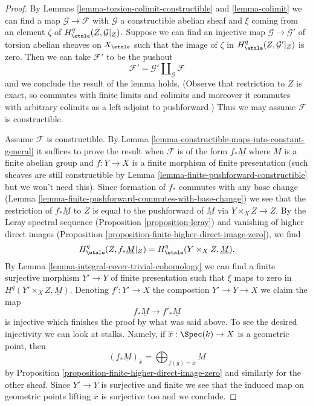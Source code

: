 \begin{proof}
By Lemmas \ref{lemma-torsion-colimit-constructible} and \ref{lemma-colimit}
we can find a map $\mathcal{G} \to \mathcal{F}$ with $\mathcal{G}$
a constructible abelian sheaf and $\xi$ coming from an element $\zeta$ of
$H^q_\etale(Z, \mathcal{G}|_Z)$. Suppose we can find an injective map
$\mathcal{G} \to \mathcal{G}'$ of torsion abelian sheaves on $X_\etale$
such that the image of $\zeta$ in $H^q_\etale(Z, \mathcal{G}'|_Z)$ is zero.
Then we can take $\mathcal{F}'$ to be the pushout
$$
\mathcal{F}' = \mathcal{G}' \amalg_{\mathcal{G}} \mathcal{F}
$$
and we conclude the result of the lemma holds. (Observe that restriction
to $Z$ is exact, so commutes with finite limits and colimits and moreover
it commutes with arbitrary colimits as a left adjoint to pushforward.)
Thus we may assume $\mathcal{F}$ is constructible.

\medskip\noindent
Assume $\mathcal{F}$ is constructible. By
Lemma \ref{lemma-constructible-maps-into-constant-general}
it suffices to prove the result when $\mathcal{F}$
is of the form $f_*\underline{M}$ where $M$ is a finite abelian group
and $f : Y \to X$ is a finite morphism of finite presentation
(such sheaves are still constructible by
Lemma \ref{lemma-finite-pushforward-constructible}
but we won't need this).
Since formation of $f_*$ commutes with any base change
(Lemma \ref{lemma-finite-pushforward-commutes-with-base-change})
we see that the restriction of $f_*\underline{M}$ to $Z$ is
equal to the pushforward of $\underline{M}$ via
$Y \times_X Z \to Z$. By the Leray spectral sequence
(Proposition \ref{proposition-leray})
and vanishing of higher direct images
(Proposition \ref{proposition-finite-higher-direct-image-zero}),
we find
$$
H^q_\etale(Z, f_*\underline{M}|_Z) = H^q_\etale(Y \times_X Z, \underline{M}).
$$
By Lemma \ref{lemma-integral-cover-trivial-cohomology}
we can find a finite surjective morphism $Y' \to Y$ of finite presentation
such that $\xi$ maps to zero in $H^q(Y' \times_X Z, \underline{M})$.
Denoting $f' : Y' \to X$ the compostion $Y' \to Y \to X$ we claim
the map
$$
f_*\underline{M} \longrightarrow f'_*\underline{M}
$$
is injective which finishes the proof by what was said above.
To see the desired injectivity we can look at stalks. Namely,
if $\overline{x} : \Spec(k) \to X$ is a geometric point, then
$$
(f_*\underline{M})_{\overline{x}} =
\bigoplus\nolimits_{f(\overline{y}) = \overline{x}} M
$$
by Proposition \ref{proposition-finite-higher-direct-image-zero}
and similarly for the other sheaf.
Since $Y' \to Y$ is surjective and finite we see that
the induced map on geometric points lifting $\overline{x}$ is
surjective too and we conclude.
\end{proof}

